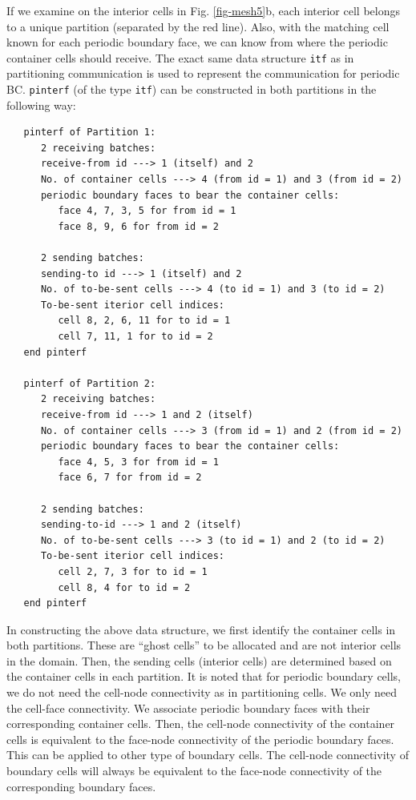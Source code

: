 \documentclass[11pt, letterpaper]{report}
\begin{document}
If we examine on the interior cells in Fig. \ref{fig-mesh5}b, each interior cell belongs to a
unique partition (separated by the red line). Also, with the matching cell known for each
periodic boundary face, we can know from where the periodic container cells should receive.
The exact same data structure \verb+itf+ as in partitioning communication is used to represent
the communication for periodic BC. \verb+pinterf+ (of the type \verb+itf+) can be constructed in both
partitions in the following way:

\begin{verbatim}
   pinterf of Partition 1:
      2 receiving batches:
      receive-from id ---> 1 (itself) and 2
      No. of container cells ---> 4 (from id = 1) and 3 (from id = 2)
      periodic boundary faces to bear the container cells:
         face 4, 7, 3, 5 for from id = 1
         face 8, 9, 6 for from id = 2

      2 sending batches:
      sending-to id ---> 1 (itself) and 2
      No. of to-be-sent cells ---> 4 (to id = 1) and 3 (to id = 2)
      To-be-sent iterior cell indices:
         cell 8, 2, 6, 11 for to id = 1
         cell 7, 11, 1 for to id = 2
   end pinterf

   pinterf of Partition 2:
      2 receiving batches:
      receive-from id ---> 1 and 2 (itself)
      No. of container cells ---> 3 (from id = 1) and 2 (from id = 2)
      periodic boundary faces to bear the container cells:
         face 4, 5, 3 for from id = 1
         face 6, 7 for from id = 2

      2 sending batches:
      sending-to-id ---> 1 and 2 (itself)
      No. of to-be-sent cells ---> 3 (to id = 1) and 2 (to id = 2)
      To-be-sent iterior cell indices:
         cell 2, 7, 3 for to id = 1
         cell 8, 4 for to id = 2
   end pinterf
\end{verbatim}

In constructing the above data structure, we first identify the container cells in both partitions.
These are ``ghost cells'' to be allocated and are not interior cells in the domain. Then, the
sending cells (interior cells) are determined based on the container cells in each partition. It is
noted that for periodic boundary cells, we do not need the cell-node connectivity as in partitioning
cells. We only need the cell-face connectivity. We associate periodic boundary faces with their
corresponding container cells. Then, the cell-node connectivity of the container cells is equivalent
to the face-node connectivity of the periodic boundary faces. This can be applied to other type of
boundary cells. The cell-node connectivity of boundary cells will always be equivalent to the
face-node connectivity of the corresponding boundary faces.
\paraspace
\end{document}
